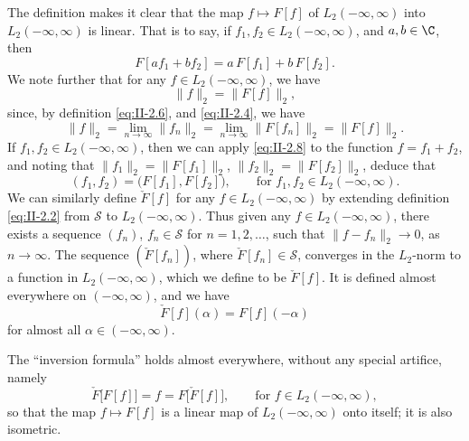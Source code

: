The definition makes it clear that the map $f\mapsto F[f]$ of $L_{2}(-\infty,\infty)$ into $L_{2}(-\infty,\infty)$ is linear. That is to say, if $f_{1},f_{2}\in L_{2}(-\infty,\infty)$, and $a,b\in\C$, then
\begin{equation}\tag{2.7}\label{eq:II-2.7}
F[a f_{1}+b f_{2}]=a\,F[f_{1}]+b\,F[f_{2}].
\end{equation}
We note further that for any $f\in L_{2}(-\infty,\infty)$, we have
\begin{equation}\tag{2.8}\label{eq:II-2.8}
\|f\|_{2}=\|F[f]\|_{2},
\end{equation}
since, by definition \eqref{eq:II-2.6}, and \eqref{eq:II-2.4}, we have
\begin{equation}\tag{2.9}\label{eq:II-2.9}
\|f\|_{2}=\lim_{n\to\infty}\|f_{n}\|_{2}
=\lim_{n\to\infty}\|F[f_{n}]\|_{2}=\|F[f]\|_{2}.
\end{equation}
If $f_{1},f_{2}\in L_{2}(-\infty,\infty)$, then we can apply \eqref{eq:II-2.8} to the function $f=f_{1}+f_{2}$, and noting that $\|f_{1}\|_{2}=\|F[f_{1}]\|_{2}$, $\|f_{2}\|_{2}=\|F[f_{2}]\|_{2}$, deduce that
\begin{equation}\tag{2.10}\label{eq:II-2.10}
(f_{1},f_{2})=\bigl(F[f_{1}],F[f_{2}]\bigr),\qquad\text{for }f_{1},f_{2}\in L_{2}(-\infty,\infty).
\end{equation}
We can similarly define $\check F[f]$ for any $f\in L_{2}(-\infty,\infty)$ by extending definition \eqref{eq:II-2.2} from $\mathcal S$ to $L_{2}(-\infty,\infty)$. Thus given any $f\in L_{2}(-\infty,\infty)$, there exists a sequence $(f_{n})$, $f_{n}\in\mathcal S$ for $n=1,2,\dots$, such that $\|f-f_{n}\|_{2}\to 0$, as $n\to\infty$. The sequence $(\check F[f_{n}])$, where $\check F[f_{n}]\in\mathcal S$, converges in the $L_{2}$-norm to a function in $L_{2}(-\infty,\infty)$, which we define to be $\check F[f]$. It is defined almost everywhere on $(-\infty,\infty)$, and we have
\begin{equation}\tag{2.11}\label{eq:II-2.11}
\check F[f](\alpha)=F[f](-\alpha)
\end{equation}
for almost all $\alpha\in(-\infty,\infty)$.

The ``inversion formula'' holds almost everywhere, without any special artifice, namely
\begin{equation*}\tag{2.11}\label{eq:II-2.11b}
\check F\bigl[F[f]\bigr]=f=F\bigl[\check F[f]\bigr],\qquad\text{for }f\in L_{2}(-\infty,\infty),
\end{equation*}
so that the map $f\mapsto F[f]$ is a linear map of $L_{2}(-\infty,\infty)$ onto itself; it is also isometric.

